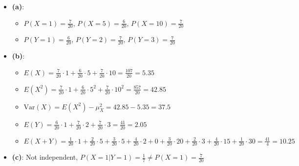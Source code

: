 \documentclass{article}
\begin{document}
\begin{itemize}
	\item \textbf{(a)}:
		\begin{itemize}
			\item $P(X=1) = \frac{7}{20}$, $P(X=5) = \frac{6}{20}$, $P(X=10) = \frac{7}{20}$
			\item $P(Y=1) = \frac{6}{20}$, $P(Y=2) = \frac{7}{20}$, $P(Y=3) = \frac{7}{20}$
		\end{itemize}
	\item \textbf{(b)}:
		\begin{itemize}
			\item $E(X) = \frac{7}{20} \cdot 1 + \frac{6}{20} \cdot 5 + \frac{7}{20} \cdot 10 =
				\frac{107}{20} = 5.35$
			\item $E(X^2) = \frac{7}{20} \cdot 1 + \frac{6}{20} \cdot 5^2 + \frac{7}{20} \cdot 10^2 =
				\frac{857}{20} = 42.85$
			\item $\mathrm{Var}(X) = E(X^2) - \mu_X^2 = 42.85 - 5.35 = 37.5$
			\item $E(Y) = \frac{6}{20} \cdot 1 + \frac{7}{20} \cdot 2 + \frac{7}{20} \cdot 3 =
				\frac{41}{20} = 2.05$
			\item $E(X+Y) =
				\frac{1}{20} \cdot 1 + \frac{2}{20} \cdot 5 + \frac{3}{20} \cdot 5 +
				\frac{4}{20} \cdot 2 + 0 + \frac{3}{20} \cdot 20 +
				\frac{2}{20} \cdot 3 + \frac{4}{20} \cdot 15 + \frac{1}{20} \cdot 30 =
				\frac{41}{4} = 10.25$
		\end{itemize}
	\item \textbf{(c)}: Not independent, $P(X=1 | Y=1) = \frac{1}{7} \ne P(X=1) = \frac{7}{20}$
\end{itemize}
\end{document}
